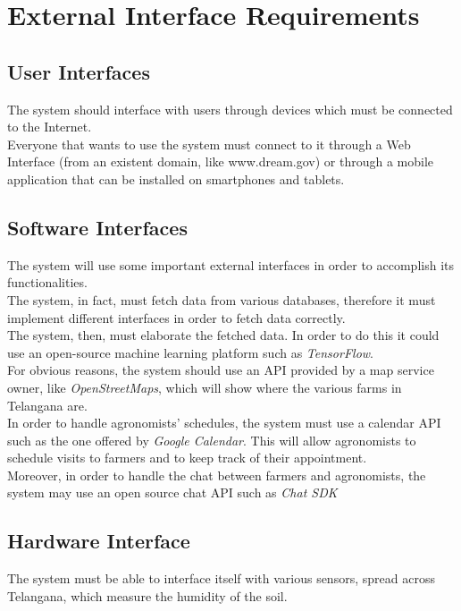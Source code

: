 \documentclass[10pt]{report}
\begin{document}
\section{External Interface Requirements}

\subsection{User Interfaces}
The system should interface with users through devices which must be connected to the Internet.\\
Everyone that wants to use the system must connect to it through a Web Interface (from an existent domain, like www.dream.gov) or through a mobile application that can be installed on smartphones and tablets.
\subsection{Software Interfaces}
The system will use some important external interfaces in order to accomplish its functionalities.\\
The system, in fact, must fetch data from various databases, therefore it must implement different interfaces in order to fetch data correctly.\\
The system, then, must elaborate the fetched data. In order to do this it could use an open-source machine learning platform such as \emph{TensorFlow}.\\
For obvious reasons, the system should use an API provided by a map service owner, like \emph{OpenStreetMaps}, which will show where the various farms in Telangana are.\\
In order to handle agronomists' schedules, the system must use a calendar API such as the one offered by \emph{Google Calendar}. This will allow agronomists to schedule visits to farmers and to keep track of their appointment.\\
Moreover, in order to handle the chat between farmers and agronomists, the system may use an open source chat API such as \emph{Chat SDK}
\subsection{Hardware Interface}
The system must be able to interface itself with various sensors, spread across Telangana, which measure the humidity of the soil.
\end{document}
